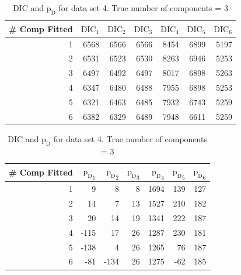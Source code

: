 \begin{table}[!htb]
\centering
\caption{DIC and $\text{p}_\text{D}$ for data set 4. True number of components = 3}
\label{table : ds_3fused_10ppg_dic}
\begin{tabular}{@{}rrrrrrr@{}}
\toprule
\# Comp Fitted & $\text{DIC}_1$ & $\text{DIC}_2$  & $\text{DIC}_3$  & $\text{DIC}_4$  & $\text{DIC}_5$  & $\text{DIC}_6$  \\ \midrule
1 & 6568 & 6566 & 6566 & 8454 & 6899 & 5197 \\
2 & 6531 & 6523 & 6530 & 8263 & 6946 & 5253 \\
3 & 6497 & 6492 & 6497 & 8017 & 6898 & 5263 \\
4 & 6347 & 6480 & 6488 & 7955 & 6898 & 5253 \\
5 & 6321 & 6463 & 6485 & 7932 & 6743 & 5259 \\
6 & 6382 & 6329 & 6489 & 7948 & 6611 & 5259 \\ \bottomrule
\end{tabular}

\begin{tabular}{@{}rrrrrrr@{}}
\toprule
\# Comp Fitted & ${\text{p}_\text{D}}_1$ & ${\text{p}_\text{D}}_2$ & ${\text{p}_\text{D}}_3$ & ${\text{p}_\text{D}}_4$ & ${\text{p}_\text{D}}_5$ & ${\text{p}_\text{D}}_6$ \\ \midrule
1 & 9 & 8 & 8 & 1694 & 139 & 127 \\
2 & 14 & 7 & 13 & 1527 & 210 & 182 \\
3 & 20 & 14 & 19 & 1341 & 222 & 187 \\
4 & -115 & 17 & 26 & 1287 & 230 & 181 \\
5 & -138 & 4 & 26 & 1265 & 76 & 187 \\
6 & -81 & -134 & 26 & 1275 & -62 & 185 \\ \bottomrule
\end{tabular}
\end{table}

